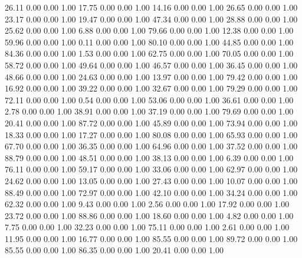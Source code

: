    26.11   0.00   0.00   1.00
   17.75   0.00   0.00   1.00
   14.16   0.00   0.00   1.00
   26.65   0.00   0.00   1.00
   23.17   0.00   0.00   1.00
   19.47   0.00   0.00   1.00
   47.34   0.00   0.00   1.00
   28.88   0.00   0.00   1.00
   25.62   0.00   0.00   1.00
    6.88   0.00   0.00   1.00
   79.66   0.00   0.00   1.00
   12.38   0.00   0.00   1.00
   59.96   0.00   0.00   1.00
    0.11   0.00   0.00   1.00
   80.10   0.00   0.00   1.00
   44.85   0.00   0.00   1.00
   84.36   0.00   0.00   1.00
    1.53   0.00   0.00   1.00
   62.75   0.00   0.00   1.00
   70.05   0.00   0.00   1.00
   58.72   0.00   0.00   1.00
   49.64   0.00   0.00   1.00
   46.57   0.00   0.00   1.00
   36.45   0.00   0.00   1.00
   48.66   0.00   0.00   1.00
   24.63   0.00   0.00   1.00
   13.97   0.00   0.00   1.00
   79.42   0.00   0.00   1.00
   16.92   0.00   0.00   1.00
   39.22   0.00   0.00   1.00
   32.67   0.00   0.00   1.00
   79.29   0.00   0.00   1.00
   72.11   0.00   0.00   1.00
    0.54   0.00   0.00   1.00
   53.06   0.00   0.00   1.00
   36.61   0.00   0.00   1.00
    2.78   0.00   0.00   1.00
   38.91   0.00   0.00   1.00
   37.19   0.00   0.00   1.00
   79.69   0.00   0.00   1.00
   20.41   0.00   0.00   1.00
   87.72   0.00   0.00   1.00
   45.89   0.00   0.00   1.00
   73.94   0.00   0.00   1.00
   18.33   0.00   0.00   1.00
   17.27   0.00   0.00   1.00
   80.08   0.00   0.00   1.00
   65.93   0.00   0.00   1.00
   67.70   0.00   0.00   1.00
   36.35   0.00   0.00   1.00
   64.96   0.00   0.00   1.00
   37.52   0.00   0.00   1.00
   88.79   0.00   0.00   1.00
   48.51   0.00   0.00   1.00
   38.13   0.00   0.00   1.00
    6.39   0.00   0.00   1.00
   76.11   0.00   0.00   1.00
   59.17   0.00   0.00   1.00
   33.06   0.00   0.00   1.00
   62.97   0.00   0.00   1.00
   24.62   0.00   0.00   1.00
   13.05   0.00   0.00   1.00
   27.43   0.00   0.00   1.00
   10.07   0.00   0.00   1.00
   88.49   0.00   0.00   1.00
   72.97   0.00   0.00   1.00
   42.10   0.00   0.00   1.00
   34.24   0.00   0.00   1.00
   62.32   0.00   0.00   1.00
    9.43   0.00   0.00   1.00
    2.56   0.00   0.00   1.00
   17.92   0.00   0.00   1.00
   23.72   0.00   0.00   1.00
   88.86   0.00   0.00   1.00
   18.60   0.00   0.00   1.00
    4.82   0.00   0.00   1.00
    7.75   0.00   0.00   1.00
   32.23   0.00   0.00   1.00
   75.11   0.00   0.00   1.00
    2.61   0.00   0.00   1.00
   11.95   0.00   0.00   1.00
   16.77   0.00   0.00   1.00
   85.55   0.00   0.00   1.00
   89.72   0.00   0.00   1.00
   85.55   0.00   0.00   1.00
   86.35   0.00   0.00   1.00
   20.41   0.00   0.00   1.00
